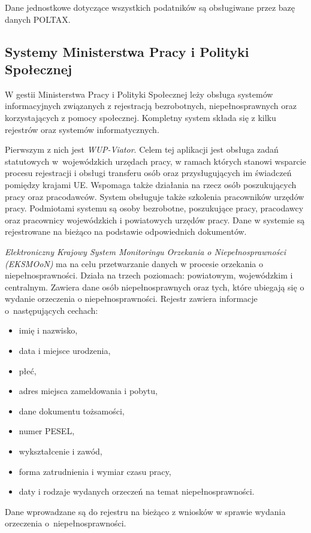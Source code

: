 Dane jednostkowe dotyczące wszystkich podatników są obsługiwane przez bazę danych POLTAX.

\subsection{Systemy Ministerstwa Pracy i Polityki Społecznej}

W gestii Ministerstwa Pracy i Polityki Społecznej leży obsługa systemów informacyjnych związanych z rejestracją bezrobotnych, niepełnosprawnych oraz korzystających z pomocy społecznej. Kompletny system składa się z kilku rejestrów oraz systemów informatycznych. 

Pierwszym z nich jest \textit{WUP-Viator}. Celem tej aplikacji jest obsługa zadań statutowych w~wojewódzkich urzędach pracy, w ramach których stanowi wsparcie procesu rejestracji i obsługi transferu osób oraz przysługujących im świadczeń pomiędzy krajami UE. Wspomaga także działania na rzecz osób poszukujących pracy oraz pracodawców. System obsługuje także szkolenia pracowników urzędów pracy. Podmiotami systemu są osoby bezrobotne, poszukujące pracy, pracodawcy oraz pracownicy wojewódzkich i powiatowych urzędów pracy. Dane w systemie są rejestrowane na bieżąco na podstawie odpowiednich dokumentów.

\textit{Elektroniczny Krajowy System Monitoringu Orzekania o Niepełnosprawności (EKSMOoN)} ma na celu przetwarzanie danych w procesie orzekania o niepełnosprawności. Działa na trzech poziomach: powiatowym, wojewódzkim i centralnym. Zawiera dane osób niepełnosprawnych oraz tych, które ubiegają się o wydanie orzeczenia o niepełnosprawności. Rejestr zawiera informacje o~następujących cechach:

\begin{itemize}
\item imię i nazwisko,
\item data i miejsce urodzenia,
\item płeć,
\item adres miejsca zameldowania i pobytu,
\item dane dokumentu tożsamości,
\item numer PESEL,
\item wykształcenie i zawód,
\item forma zatrudnienia i wymiar czasu pracy,
\item daty i rodzaje wydanych orzeczeń na temat niepełnosprawności.
\end{itemize}

Dane wprowadzane są do rejestru na bieżąco z wniosków w sprawie wydania orzeczenia o~niepełnosprawności.

